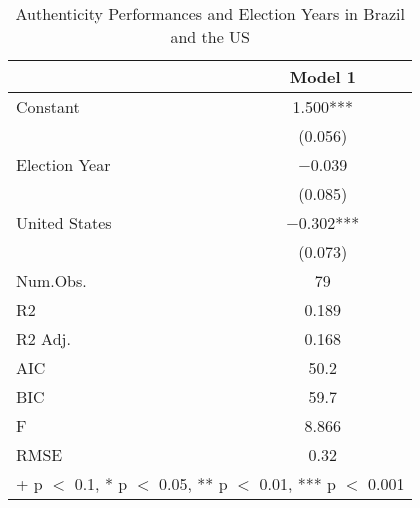 \documentclass[
  12pt,
]{article}
\begin{document}
\begin{table}

\caption{\label{tab:table 4}Authenticity Performances and Election Years in Brazil and the US}
\centering
\begin{tabular}[t]{lc}
\toprule
  & Model 1\\
\midrule
Constant & \num{1.500}***\\
 & (\num{0.056})\\
Election Year & \num{-0.039}\\
 & (\num{0.085})\\
United States & \num{-0.302}***\\
 & (\num{0.073})\\
\midrule
Num.Obs. & \num{79}\\
R2 & \num{0.189}\\
R2 Adj. & \num{0.168}\\
AIC & \num{50.2}\\
BIC & \num{59.7}\\
F & \num{8.866}\\
RMSE & \num{0.32}\\
\bottomrule
\multicolumn{2}{l}{\rule{0pt}{1em}+ p $<$ 0.1, * p $<$ 0.05, ** p $<$ 0.01, *** p $<$ 0.001}\\
\end{tabular}
\end{table}
\end{document}
